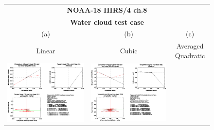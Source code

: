 \begin{figure}[htp]
  \centering
  \begin{tabular}{c c c}
    \multicolumn{3}{c}{\qquad\sffamily\textbf{NOAA-18 HIRS/4 ch.8}}\\
    \multicolumn{3}{c}{\qquad\sffamily\textbf{Water cloud test case}}\\
    \qquad\textsf{(a)} & \qquad\textsf{(b)}  & \qquad\textsf{(c)} \\
    \qquad\textsf{Linear} & \qquad\textsf{Cubic}  & \qquad\textsf{Averaged Quadratic} \\
    \includegraphics[bb=90 400 300 540,clip,scale=0.7]{graphics/Cloud/TL/hirs4_n18.ch8.WATER.NLIN.dg_dReff.eps} &
    \includegraphics[bb=90 400 300 540,clip,scale=0.7]{graphics/Cloud/TL/hirs4_n18.ch8.WATER.NCUBIC.dg_dReff.eps} &

\end{tabular}
\end{figure}
